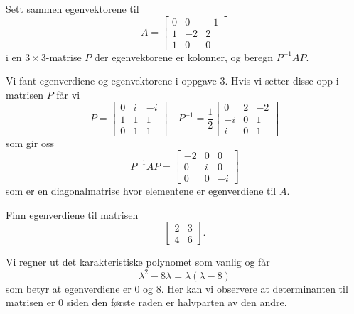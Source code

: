 \begin{oppgave}
Sett sammen egenvektorene til 
\[
A=
\begin{bmatrix}
0 & 0 & -1 \\ 1 & -2 & 2 \\ 1 & 0 & 0 
\end{bmatrix}
\]
i en $3 \times 3$-matrise $P$ der egenvektorene er kolonner, og beregn $P^{-1} A P$.
\end{oppgave}

\begin{losning}
	Vi fant egenverdiene og egenvektorene i oppgave 3. Hvis vi setter disse opp i matrisen $P$ får vi
	\begin{equation*}
		P = \begin{bmatrix}
				0 & i & -i \\
				1 & 1 & 1 \\
				0 & 1 & 1 
			\end{bmatrix}
			\quad P^{-1} = \frac{1}{2}
			\begin{bmatrix}
				0 & 2 & -2 \\
				 -i & 0 & 1 \\
				 i & 0 & 1
			\end{bmatrix}
	\end{equation*}
	som gir oss
	\begin{equation*}
		P^{-1}AP = \begin{bmatrix}
			-2 & 0 & 0 \\
			0 & i & 0 \\
			0 & 0 & -i 
		\end{bmatrix}
	\end{equation*}
	som er en diagonalmatrise hvor elementene er egenverdiene til $A$.
\end{losning}

\begin{oppgave}
Finn egenverdiene til matrisen 
\[
\begin{bmatrix}
2 & 3  \\ 4 & 6 
\end{bmatrix}.
\]
\end{oppgave}

\begin{losning}
	Vi regner ut det karakteristiske polynomet som vanlig og får 
	\begin{equation*}
		\lambda^2 - 8\lambda = \lambda(\lambda - 8)
	\end{equation*}
	som betyr at egenverdiene er $0$ og $8$. Her kan vi observere at determinanten til matrisen er $0$ siden den første raden er halvparten av den andre.
\end{losning}

